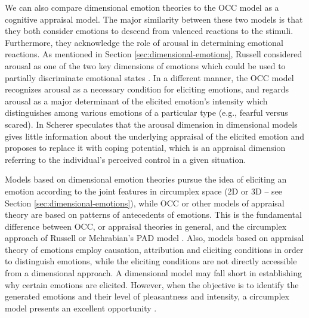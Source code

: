 \documentclass[12pt]{report}
\begin{document}
We can also compare dimensional emotion theories to the OCC model as a cognitive
appraisal model. The major similarity between these two models is that they both
consider emotions to descend from valenced reactions to the stimuli.
Furthermore, they acknowledge the role of arousal in determining emotional
reactions. As mentioned in Section \ref{sec:dimensional-emotions}, Russell
considered arousal as one of the two key dimensions of emotions which could be
used to partially discriminate emotional states
\cite{russell:circumplex-affect}. In a different manner, the OCC model
recognizes arousal as a necessary condition for eliciting emotions, and regards
arousal as a major determinant of the elicited emotion's intensity which
distinguishes among various emotions of a particular type (e.g., fearful versus
scared). In \cite{scherer:what-emotions} Scherer speculates that the arousal
dimension in dimensional models gives little information about the underlying
appraisal of the elicited emotion and proposes to replace it with coping
potential, which is an appraisal dimension referring to the individual's
perceived control in a given situation.

Models based on dimensional emotion theories pursue the idea of eliciting an
emotion according to the joint features in circumplex space (2D or 3D -- see
Section \ref{sec:dimensional-emotions}), while OCC or other models of appraisal
theory are based on patterns of antecedents of emotions. This is the fundamental
difference between OCC, or appraisal theories in general, and the circumplex
approach of Russell \cite{russell:circumplex-affect} or Mehrabian's PAD model
\cite{mehrabian:pad,mehrabian-russell:pad}. Also, models based on appraisal
theory of emotions employ causation, attribution and eliciting conditions in
order to distinguish emotions, while the eliciting conditions are not directly
accessible from a dimensional approach. A dimensional model may fall short in
establishing why certain emotions are elicited. However, when the objective is
to identify the generated emotions and their level of pleasantness and
intensity, a circumplex model presents an excellent opportunity
\cite{ahmadpour:occ-dimensional-comparison}.
\end{document}
